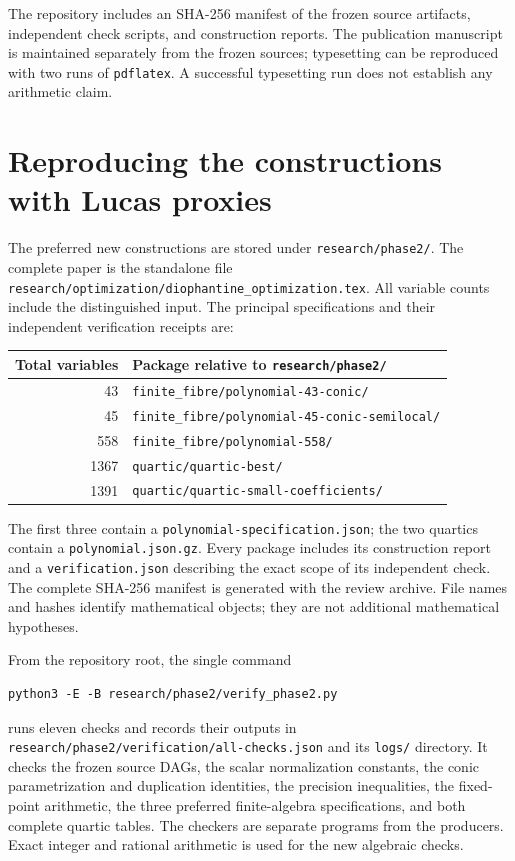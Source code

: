 \documentclass[11pt]{article}
\theoremstyle{definition}
\begin{document}
The repository includes an SHA-256 manifest of the frozen source
artifacts, independent check scripts, and construction reports. The
publication manuscript is maintained separately from the frozen sources;
typesetting can be reproduced with two runs of \texttt{pdflatex}.
A successful typesetting run does not establish any arithmetic claim.


\section{Reproducing the constructions with Lucas proxies}
\label{sec:phase2-reproducibility}

The preferred new constructions are stored under
\nolinkurl{research/phase2/}. The complete paper is the standalone file
\nolinkurl{research/optimization/diophantine_optimization.tex}.
All variable counts include the distinguished input. The principal
specifications and their independent verification receipts are:
\begin{center}
\small
\begin{tabular}{r p{82mm}}
\toprule
Total variables & Package relative to \texttt{research/phase2/}\\
\midrule
43 & \nolinkurl{finite_fibre/polynomial-43-conic/}\\
45 & \nolinkurl{finite_fibre/polynomial-45-conic-semilocal/}\\
558 & \nolinkurl{finite_fibre/polynomial-558/}\\
1367 & \nolinkurl{quartic/quartic-best/}\\
1391 & \nolinkurl{quartic/quartic-small-coefficients/}\\
\bottomrule
\end{tabular}
\end{center}
The first three contain a
\nolinkurl{polynomial-specification.json}; the two quartics contain a
\nolinkurl{polynomial.json.gz}. Every package includes its construction
report and a \nolinkurl{verification.json} describing the exact scope
of its independent check. The complete SHA-256 manifest is generated
with the review archive. File names and hashes identify mathematical
objects; they are not additional mathematical hypotheses.

From the repository root, the single command
\begin{verbatim}
python3 -E -B research/phase2/verify_phase2.py
\end{verbatim}
runs eleven checks and records their outputs in
\nolinkurl{research/phase2/verification/all-checks.json} and its
\nolinkurl{logs/} directory. It checks the frozen source DAGs,
the scalar normalization constants, the conic parametrization and
duplication identities, the precision inequalities, the fixed-point
arithmetic, the three preferred finite-algebra specifications, and
both complete quartic tables. The checkers are separate programs from
the producers. Exact integer and rational arithmetic is used for the
new algebraic checks.
\end{document}
